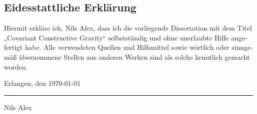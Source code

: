 \begin{ngerman}
\chapter{Eidesstattliche Erklärung}

Hiermit erkläre ich, Nils Alex, dass ich die vorliegende Dissertation mit dem Titel „Covariant Constructive Gravity“ selbstständig und ohne unerlaubte Hilfe angefertigt habe. Alle verwendeten Quellen und Hilfsmittel sowie wörtlich oder sinngemäß übernommene Stellen aus anderen Werken sind als solche kenntlich gemacht worden.
\vspace{1cm}

Erlangen, den \today{}
\vspace{1cm}

\begin{minipage}{5cm}
  \hrule\vspace{1ex}
  Nils Alex
\end{minipage}

\end{ngerman}
